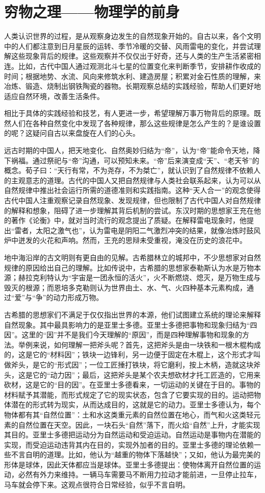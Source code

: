 \documentclass[12pt,UTF8,fontset=none]{ctexbook}
\begin{document}
\section{穷物之理——物理学的前身}

人类认识世界的过程，是从观察身边发生的自然现象开始的。自古以来，各个文明中的人们都注意到日月星辰的运转、季节冷暖的交替、风雨雷电的变化，并尝试理解这些现象背后的规律。这些观察并不仅仅出于好奇，还与人类的生产生活紧密相连。比如，古代中国人通过观测北斗七星的位置变化来判断季节，安排耕作收成的时间；根据地势、水流、风向来修筑水利、建造房屋；积累对金石性质的理解，来冶炼、锻造、烧制出钢铁陶瓷的器物。长期观察总结的实践经验，帮助人们更好地适应自然环境，改善生活条件。

相比于具体的实践经验和技艺，有人更进一步，希望理解万事万物背后的原理。既然人们在各种自然变化中发现了各种规律，那么这些规律是怎么产生的？是谁设置的呢？这疑问自古以来盘旋在人们的心头。

远古时期的中国人，把天地变化、自然奥妙归结为“帝”，认为“帝”能命令天地，降下祸福。通过祭祀与“帝”沟通，可以预知未来。“帝”后来演变成“天”、“老天爷”的概念。荀子曰：“天行有常，不为尧存，不为桀亡”，就认识到了自然规律不依赖人的主观意志的道理。古代的中国人又把自然规律与人类社会联系起来，认为可以从自然规律中推出社会运行所需的道德准则和实践指南。这种“天人合一”的观念使得古代中国人注重观察记录自然现象、发现规律，但也限制了古代中国人对自然规律的解释和想象，阻碍了进一步理解其背后机制的尝试。东汉时期的思想家王充在他的著作《论衡》中，就对当时流行的观念提出了质疑。在解释雷电现象时，他提出“雷者，太阳之激气也”，认为雷电是阴阳二气激烈冲突的结果，就像冶炼时鼓风炉中迸发的火花和声响。然而，王充的思辩未受重视，淹没在历史的浪花中。

地中海沿岸的古文明则有更自由的见解。古希腊林立的城邦中，不少思想家对自然规律的原因给出自己的理解。比如传说中，古希腊的思想家泰勒斯认为水是万物本源；赫拉克利特认为“宇宙是一团永恒的活火”，火不断燃烧、熄灭，是万物生成与毁灭的根源；而恩培多克勒则认为世界由土、水、气、火四种基本元素构成，通过“爱”与“争”的动力形成万物。

古希腊的思想家们不满足于仅仅指出世界的本源，他们试图建立系统的理论来解释自然现象。其中最具影响力的是亚里士多德。亚里士多德把事物和现象归结为“四因”。这里的“因”并不是我们今天理解的“原因”，而是四种理解事物和现象的方法。举例来说，如何理解一把斧头呢？首先，这把斧头是由一块铁和一根木棍构成的，这是它的“材料因”；铁块一边锋利，另一边便于固定在木棍上，这个形式才叫做斧头，是它的“形式因”；一位工匠捶打铁块，将它磨利，按上木柄，造就这块斧头，这是它的“动力因”；最后，这把斧头是某个农夫想砍材才托工匠造的，它用来砍材，这是它的“目的因”。在亚里士多德看来，一切运动的关键在于目的。事物的材料赋予其潜能，而形式规定了它的现实状态，包含了它要实现的目的。运动把物体潜在的形式转为现实，从而达成目的，这就是它的动力。亚里士多德认为，每个物体都有其“自然位置”：土和水这类重元素的自然位置在地心，而气和火这类轻元素的自然位置在天空。因此，一块石头“自然”落下，而火焰“自然”上升，才能实现其目的。亚里士多德把运动分为自然运动和受迫运动。自然运动是事物内在潜能的实现，而受迫运动违背其内在目的，实现外加者的目的。亚里士多德的理论依赖一些不言自明的道理。比如，他认为“越重的物体下落越快”；又如，他认为最完美的形体是球体，因此天体都应当是球体。亚里士多德提出：使物体离开自然位置的运动，必然有外力来维持。一辆马车需要马不断用力拉动才能前进，一旦停止拉车，马车就会停下来。这观点很符合日常经验，似乎不言自明。
\end{document}
